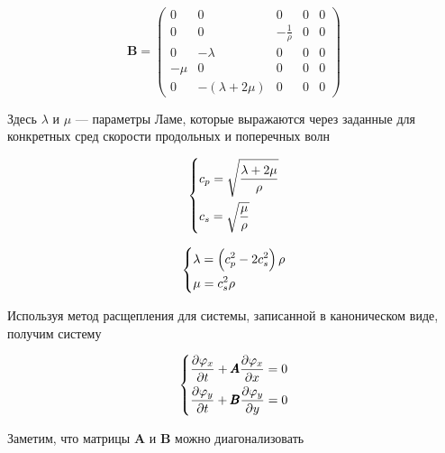 \begin{equation}
    \pmb{B} = \begin{pmatrix}
        0 & 0 & 0 & 0 & 0 \\
        0 & 0 & -\frac{1}{\rho} & 0 & 0 \\
        0 & -\lambda & 0 & 0 & 0 \\
        -\mu & 0 & 0 & 0 & 0 \\
        0 & -(\lambda+2\mu) & 0 & 0 & 0
    \end{pmatrix}
\end{equation}

Здесь $\lambda$ и $\mu$ --- параметры Ламе, которые выражаются через заданные для конкретных сред скорости продольных и поперечных волн

\begin{equation}
    \begin{dcases}
        c_p = \sqrt{\dfrac{\lambda + 2\mu}{\rho}} \\
        c_s = \sqrt{\dfrac{\mu}{\rho}}
    \end{dcases}
\end{equation}

\begin{equation}
    \begin{dcases}
        \lambda = \left(c_p^2 - 2 c_s^2\right) \rho \\
        \mu = c_s^2 \rho
    \end{dcases}
\end{equation}

Используя метод расщепления для системы, записанной в каноническом виде, получим систему

\begin{equation}
    \begin{dcases}
        \dfrac{\partial \varphi_x}{\partial t} + \pmb{A} \dfrac{\partial \varphi_x}{\partial x} = 0 \\
        \dfrac{\partial \varphi_y}{\partial t} + \pmb{B} \dfrac{\partial \varphi_y}{\partial y} = 0
    \end{dcases}
    \label{eq:rashepl_elastic}
\end{equation}

Заметим, что матрицы $\pmb{A}$ и $\pmb{B}$ можно диагонализовать

